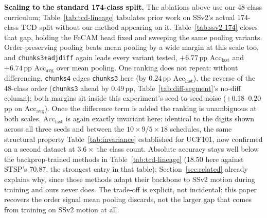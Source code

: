 \documentclass[11pt]{article}
\begin{document}
\textbf{Scaling to the standard 174-class split.} The ablations above use
our 48-class curriculum; Table~\ref{tab:tcd-lineage} tabulates prior work
on SSv2's actual 174-class TCD split without our method appearing on it.
Table~\ref{tab:ssv2-174} closes that gap, holding the FeCAM head fixed and
sweeping the same pooling variants. Order-preserving pooling beats mean
pooling by a wide margin at this scale too, and \texttt{chunks3+adjdiff}
again leads every variant tested, $+6.77$\,pp $\mathrm{Acc}_{\mathrm{last}}$
and $+6.74$\,pp $\mathrm{Acc}_{\mathrm{avg}}$ over mean pooling. One
ranking does not repeat: without differencing, \texttt{chunks4} edges
\texttt{chunks3} here (by $0.24$\,pp $\mathrm{Acc}_{\mathrm{last}}$), the
reverse of the 48-class order (\texttt{chunks3} ahead by $0.49$\,pp,
Table~\ref{tab:diff-segment}'s no-diff column); both margins sit inside
this experiment's seed-to-seed noise ($\pm0.18$--$0.20$\,pp on
$\mathrm{Acc}_{\mathrm{avg}}$). Once the difference term is added the
ranking is unambiguous at both scales. $\mathrm{Acc}_{\mathrm{last}}$ is
again exactly invariant here: identical to the digits shown across all
three seeds and between the $10{\times}9$/$5{\times}18$ schedules, the same
structural property Table~\ref{tab:invariance} established for UCF101, now
confirmed on a second dataset at $3.6\times$ the class count. Absolute
accuracy stays well below the backprop-trained methods in
Table~\ref{tab:tcd-lineage} (18.50 here against STSP's 70.87, the
strongest entry in that table); Section~\ref{sec:related} already
explains why, since those methods adapt their backbone to SSv2 motion
during training and ours never does. The trade-off is explicit, not
incidental: this paper recovers the order signal mean pooling discards,
not the larger gap that comes from training on SSv2 motion at all.
\end{document}
